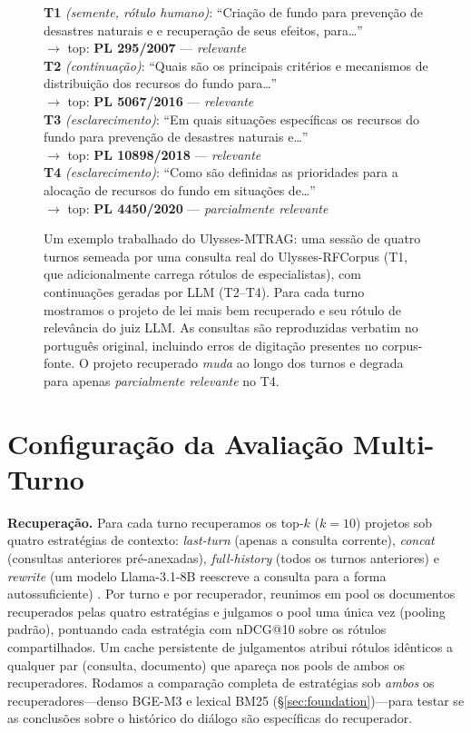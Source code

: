 \documentclass[conference]{IEEEtran}
\begin{document}
\begin{figure}[t]
\small\setlength{\parindent}{0pt}
\textbf{T1} \emph{(semente, rótulo humano)}: ``Criação de fundo para prevenção de desastres naturais e e recuperação de seus efeitos, para\ldots''\\
$\rightarrow$ top: \textbf{PL 295/2007} --- \emph{relevante}\\[3pt]
\textbf{T2} \emph{(continuação)}: ``Quais são os principais critérios e mecanismos de distribuição dos recursos do fundo para\ldots''\\
$\rightarrow$ top: \textbf{PL 5067/2016} --- \emph{relevante}\\[3pt]
\textbf{T3} \emph{(esclarecimento)}: ``Em quais situações específicas os recursos do fundo para prevenção de desastres naturais e\ldots''\\
$\rightarrow$ top: \textbf{PL 10898/2018} --- \emph{relevante}\\[3pt]
\textbf{T4} \emph{(esclarecimento)}: ``Como são definidas as prioridades para a alocação de recursos do fundo em situações de\ldots''\\
$\rightarrow$ top: \textbf{PL 4450/2020} --- \emph{parcialmente relevante}
\caption{Um exemplo trabalhado do Ulysses-MTRAG: uma sessão de quatro turnos
semeada por uma consulta real do Ulysses-RFCorpus (T1, que adicionalmente
carrega rótulos de especialistas), com continuações geradas por LLM (T2--T4).
Para cada turno mostramos o projeto de lei mais bem recuperado e seu rótulo de
relevância do juiz LLM. As consultas são reproduzidas verbatim no português
original, incluindo erros de digitação presentes no corpus-fonte. O projeto
recuperado \emph{muda} ao longo dos turnos e degrada para apenas
\emph{parcialmente relevante} no T4.}
\label{fig:example}
\end{figure}

\section{Configuração da Avaliação Multi-Turno}
\label{sec:setup}
\textbf{Recuperação.} Para cada turno recuperamos os top-$k$ ($k{=}10$)
projetos sob quatro estratégias de contexto: \emph{last-turn} (apenas a
consulta corrente), \emph{concat} (consultas anteriores pré-anexadas),
\emph{full-history} (todos os turnos anteriores) e \emph{rewrite} (um modelo
Llama-3.1-8B reescreve a consulta para a forma autossuficiente)
\cite{Mao2023LLM4CS,Elgohary2019CANARD}. Por turno e por recuperador, reunimos
em pool os documentos recuperados pelas quatro estratégias e julgamos o pool
uma única vez (pooling padrão), pontuando cada estratégia com nDCG@10 sobre os
rótulos compartilhados. Um cache persistente de julgamentos atribui rótulos
idênticos a qualquer par (consulta, documento) que apareça nos pools de ambos
os recuperadores. Rodamos a comparação completa de estratégias sob \emph{ambos}
os recuperadores---denso BGE-M3 e lexical BM25 (\S\ref{sec:foundation})---para
testar se as conclusões sobre o histórico do diálogo são específicas do
recuperador.
\end{document}
